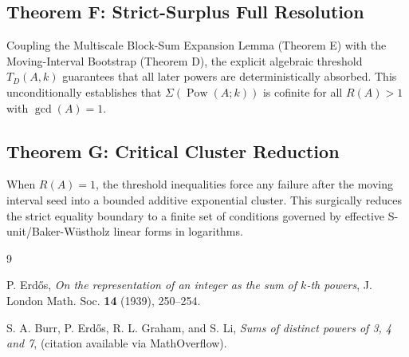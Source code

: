 \documentclass[12pt,reqno]{amsart}
\theoremstyle{definition}
\begin{document}
\subsection{Theorem F: Strict-Surplus Full Resolution}
Coupling the Multiscale Block-Sum Expansion Lemma (Theorem E) with the Moving-Interval Bootstrap (Theorem D), the explicit algebraic threshold $T_D(A,k)$ guarantees that all later powers are deterministically absorbed. This unconditionally establishes that $\Sigma(\operatorname{Pow}(A; k))$ is cofinite for all $R(A) > 1$ with $\gcd(A)=1$.

\subsection{Theorem G: Critical Cluster Reduction}
When $R(A) = 1$, the threshold inequalities force any failure after the moving interval seed into a bounded additive exponential cluster. This surgically reduces the strict equality boundary to a finite set of conditions governed by effective S-unit/Baker-W\"{u}stholz linear forms in logarithms.

\begin{thebibliography}{9}

P. Erd\H{o}s, \emph{On the representation of an integer as the sum of $k$-th powers}, J. London Math. Soc. \textbf{14} (1939), 250--254.

S. A. Burr, P. Erd\H{o}s, R. L. Graham, and S. Li, \emph{Sums of distinct powers of 3, 4 and 7}, (citation available via MathOverflow).

\end{thebibliography}
\end{document}
